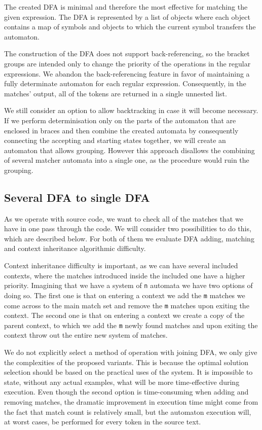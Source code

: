 The created DFA is minimal and therefore the most effective for matching
the given expression. The DFA is represented by a list of objects where
each object contains a map of symbols and objects to which the current
symbol transfers the automaton.

The construction of the DFA does not support back-referencing, so the bracket
groups are intended only to change the priority of the operations in the
regular expressions. We abandon the back-referencing feature in favor of
maintaining a fully determinate automaton for each regular expression.
Consequently, in the matches' output, all of the tokens are returned in a
single unnested list. 


We still consider an option to allow backtracking in case it will become
necessary.  If we perform determinisation only on the parts of the automaton
that are enclosed in braces and then combine the created automata by
consequently connecting the accepting and starting states together, we will
create an automaton that allows grouping. However this approach disallows the
combining of several matcher automata into a single one, as the procedure would
ruin the grouping.

\subsection{Several DFA to single DFA}
As we operate with source code, we want to check all of the matches that we
have in one pass through the code. We will consider two possibilities to do
this, which are described below. For both of them we evaluate DFA adding,
matching and context inheritance algorithmic difficulty.

Context inheritance difficulty is important, as we can have several included
contexts, where the matches introduced inside the included one have a higher
priority. Imagining that we have a system of \verb/n/ automata we have two
options of doing so. The first one is that on entering a context we add the
\verb/m/ matches we come across to the main match set and remove the \verb/m/
matches upon exiting the context. The second one is that on entering a context
we create a copy of the parent context, to which we add the \verb/m/ newly
found matches and upon exiting the context throw out the entire new system of
matches.

We do not explicitly select a method of operation with joining DFA, we only
give the complexities of the proposed variants. This is because the optimal
solution selection should be based on the practical uses of the system. It is
impossible to state, without any actual examples, what will be more
time-effective during execution. Even though the second option is
time-consuming when adding and removing matches, the dramatic improvement in
execution time might come from the fact that match count is relatively small,
but the automaton execution will, at worst cases, be performed for every token
in the source text.

